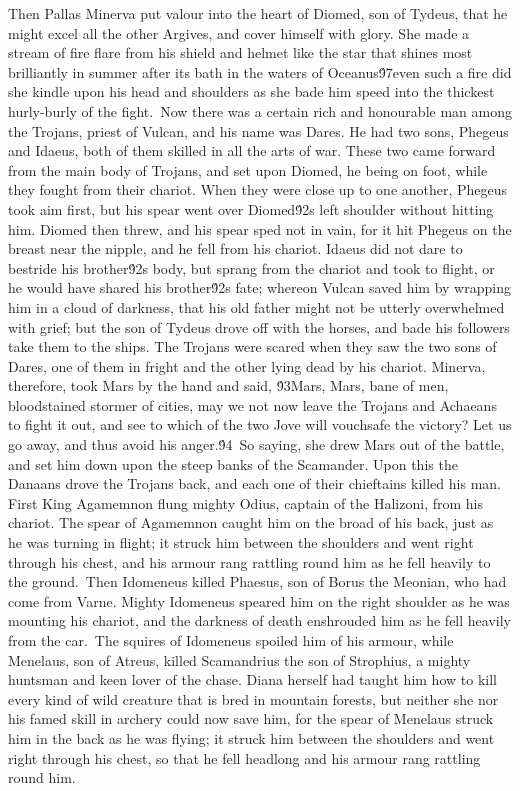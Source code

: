 {  Then Pallas Minerva put valour into the heart of Diomed, son of Tydeus, that he might excel all the other Argives, and cover himself with glory. She made a stream of fire flare from his shield and helmet like the star that shines most brilliantly in summer after its bath in the waters of Oceanus\'97even such a fire did she kindle upon his head and shoulders as she bade him speed into the thickest hurly-burly of the fight.\
Now there was a certain rich and honourable man among the Trojans, priest of Vulcan, and his name was Dares. He had two sons, Phegeus and Idaeus, both of them skilled in all the arts of war. These two came forward from the main body of Trojans, and set upon Diomed, he being on foot, while they fought from their chariot. When they were close up to one another, Phegeus took aim first, but his spear went over Diomed\'92s left shoulder without hitting him. Diomed then threw, and his spear sped not in vain, for it hit Phegeus on the breast near the nipple, and he fell from his chariot. Idaeus did not dare to bestride his brother\'92s body, but sprang from the chariot and took to flight, or he would have shared his brother\'92s fate; whereon Vulcan saved him by wrapping him in a cloud of darkness, that his old father might not be utterly overwhelmed with grief; but the son of Tydeus drove off with the horses, and bade his followers take them to the ships. The Trojans were scared when they saw the two sons of Dares, one of them in fright and the other lying dead by his chariot. Minerva, therefore, took Mars by the hand and said, \'93Mars, Mars, bane of men, bloodstained stormer of cities, may we not now leave the Trojans and Achaeans to fight it out, and see to which of the two Jove will vouchsafe the victory? Let us go away, and thus avoid his anger.\'94\
So saying, she drew Mars out of the battle, and set him down upon the steep banks of the Scamander. Upon this the Danaans drove the Trojans back, and each one of their chieftains killed his man. First King Agamemnon flung mighty Odius, captain of the Halizoni, from his chariot. The spear of Agamemnon caught him on the broad of his back, just as he was turning in flight; it struck him between the shoulders and went right through his chest, and his armour rang rattling round him as he fell heavily to the ground.\
Then Idomeneus killed Phaesus, son of Borus the Meonian, who had come from Varne. Mighty Idomeneus speared him on the right shoulder as he was mounting his chariot, and the darkness of death enshrouded him as he fell heavily from the car.\
The squires of Idomeneus spoiled him of his armour, while Menelaus, son of Atreus, killed Scamandrius the son of Strophius, a mighty huntsman and keen lover of the chase. Diana herself had taught him how to kill every kind of wild creature that is bred in mountain forests, but neither she nor his famed skill in archery could now save him, for the spear of Menelaus struck him in the back as he was flying; it struck him between the shoulders and went right through his chest, so that he fell headlong and his armour rang rattling round him.\
}
